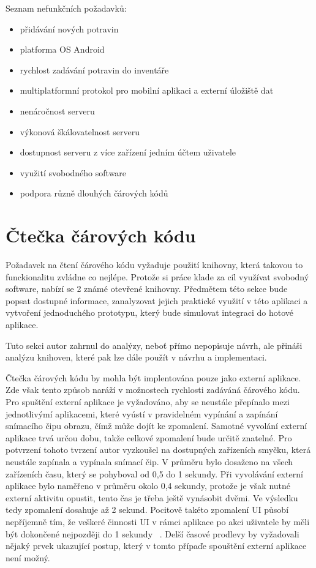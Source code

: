 \documentclass[thesis=B,czech]{FITthesis}[2013/10/20]
\begin{document}
Seznam nefunkčních požadavků:

\begin{itemize}
  \item přidávání nových potravin
  \item platforma OS Android
  \item rychlost zadávání potravin do inventáře
  \item multiplatformní protokol pro mobilní aplikaci a externí úložiště dat
  \item nenáročnost serveru
  \item výkonová škálovatelnost serveru
  \item dostupnost serveru z více zařízení jedním účtem uživatele
  \item využití svobodného software
  \item podpora různě dlouhých čárových kódů
\end{itemize}

\clearpage

\section{Čtečka čárových kódu}

Požadavek na čtení čárového kódu vyžaduje použití knihovny, která takovou to funckionalitu zvládne co nejlépe. Protože si práce klade za cíl využívat svobodný software, nabízí se 2 známé otevřené knihovny. Předmětem této sekce bude popsat dostupné informace, zanalyzovat jejich praktické využití v této aplikaci a vytvoření jednoduchého prototypu, který bude simulovat integraci do hotové aplikace.

Tuto sekci autor zahrnul do analýzy, neboť přímo nepopisuje návrh, ale přináši analýzu knihoven, které pak lze dále použít v návrhu a implementaci.

Čtečka čárových kódu by mohla být implentována pouze jako externí aplikace. Zde však tento způsob naráží v možnostech rychlosti zadáváná čárového kódu. Pro spuštění externí aplikace je vyžadováno, aby se neustále přepínalo mezi jednotlivýmí aplikacemi, které vyústí v pravidelném vypínání a zapínání snímacího čipu obrazu, čímž může dojít ke zpomalení. Samotné vyvolání externí aplikace trvá určou dobu, takže celkové zpomalení bude určitě znatelné. Pro potvrzení tohoto tvrzení autor vyzkoušel na dostupných zařízeních smyčku, která neustále zapínala a vypínala snímací čip. V průměru bylo dosaženo na všech zařízeních času, který se pohyboval od 0,5 do 1 sekundy. Při vyvolávání externí aplikace bylo naměřeno v průměru okolo 0,4 sekundy, protože je však nutné externí aktivitu opustit,  tento čas je třeba ještě vynásobit dvěmi. Ve výsledku tedy zpomalení dosahuje až 2 sekund. Pocitově takéto zpomalení UI působí nepříjemně tím, že veškeré činnosti UI v rámci aplikace po akci uživatele by měli být dokončené nejpozději do 1 sekundy ~\cite{ui_maxlag}. Delší časové prodlevy by vyžadovali nějaký prvek ukazující postup, který v tomto přípaďe spouštění externí aplikace není možný.
\end{document}
